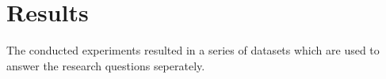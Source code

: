 \iffalse  \fi
\chapter{Results}

The conducted experiments resulted in a series of datasets which are used to answer the research questions seperately. 